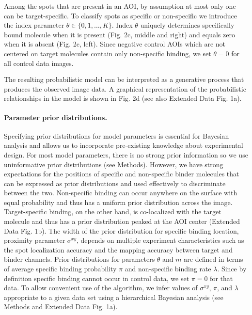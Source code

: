 Among the spots that are present in an AOI, by assumption at most only one can be target-specific. To classify spots as specific or non-specific we introduce the index parameter $\theta \in \{0,1,\dots,K\}$. Index $\theta$ uniquely determines specifically bound molecule when it is present (Fig. 2c, middle and right) and equals zero when it is absent (Fig. 2c, left). Since negative control AOIs which are not centered on target molecules contain only non-specific binding, we set $\theta = 0$ for all control data images. 

The resulting probabilistic model can be interpreted as a generative process that produces the observed image data. A graphical representation of the probabilistic relationships in the model is shown in Fig. 2d (see also Extended Data Fig. 1a).

\paragraph{Parameter prior distributions.}
Specifying prior distributions for model parameters is essential for Bayesian analysis and allows us to incorporate pre-existing knowledge about experimental design. For most model parameters, there is no strong prior information so we use uninformative prior distributions (see Methods). However, we have strong expectations for the positions of specific and non-specific binder molecules that can be expressed as prior distributions and used effectively to discriminate between the two. Non-specific binding can occur anywhere on the surface with equal probability and thus has a uniform prior distribution across the image. Target-specific binding, on the other hand, is co-localized with the target molecule and thus has a prior distribution peaked at the AOI center (Extended Data Fig. 1b). The width of the prior distribution for specific binding location, proximity parameter $\sigma^{xy}$, depends on multiple experiment characteristics such as the spot localization accuracy and the mapping accuracy between target and binder channels. Prior distributions for parameters $\theta$ and $m$ are defined in terms of average specific binding probability $\pi$ and non-specific binding rate $\lambda$. Since by definition specific binding cannot occur in control data, we set $\pi = 0$ for that data. To allow convenient use of the algorithm, we infer values of $\sigma^{xy}$, $\pi$, and $\lambda$ appropriate to a given data set using a hierarchical Bayesian analysis (see Methods and Extended Data Fig. 1a). 

